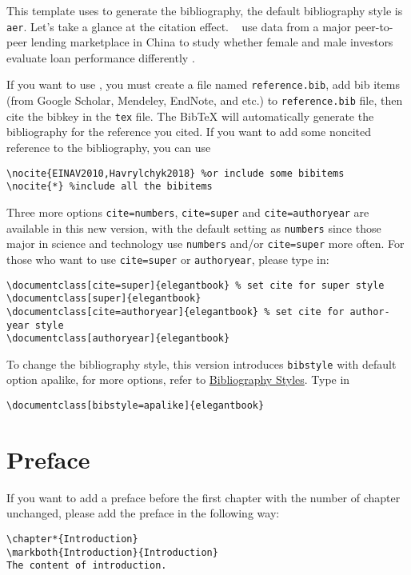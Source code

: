 \documentclass[11pt,fancy,twocol,twoside]{elegantbook}
\begin{document}
This template uses  to generate the bibliography, the default bibliography style is \lstinline{aer}. Let's take a glance at the citation effect. ~\cite{en1} use data from a major peer-to-peer lending \cite{en3} marketplace in China to study whether female and male investors evaluate loan performance differently \parencite{en2}. 

If you want to use , you must create a file named \lstinline{reference.bib}, add bib items (from Google Scholar, Mendeley, EndNote, and etc.) to \lstinline{reference.bib} file, then cite the bibkey in the \lstinline{tex} file. The Bib\TeX{} will automatically generate the bibliography for the reference you cited. If you want to add some noncited reference to the bibliography, you can use 
\begin{lstlisting}[frame=single]
\nocite{EINAV2010,Havrylchyk2018} %or include some bibitems
\nocite{*} %include all the bibitems
\end{lstlisting}

Three more options \lstinline{cite=numbers}, \lstinline{cite=super} and \lstinline{cite=authoryear} are available in this new version, with the default setting as \lstinline{numbers} since those major in science and technology use \lstinline{numbers} and/or \lstinline{cite=super} more often. For those who want to use \lstinline{cite=super} or \lstinline{authoryear}, please type in:
\begin{lstlisting}
\documentclass[cite=super]{elegantbook} % set cite for super style 
\documentclass[super]{elegantbook}
\documentclass[cite=authoryear]{elegantbook} % set cite for author-year style
\documentclass[authoryear]{elegantbook}
\end{lstlisting}

To change the bibliography style, this version introduces \lstinline{bibstyle} with default option apalike, for more options, refer to \href{https://www.overleaf.com/learn/latex/Bibtex_bibliography_styles}{ Bibliography Styles}. Type in
\begin{lstlisting}
\documentclass[bibstyle=apalike]{elegantbook} 
\end{lstlisting}

\section{Preface}

If you want to add a preface before the first chapter with the number of chapter unchanged, please add the preface in the following way:
\begin{lstlisting}
\chapter*{Introduction}
\markboth{Introduction}{Introduction}
The content of introduction.
\end{lstlisting}
\end{document}

